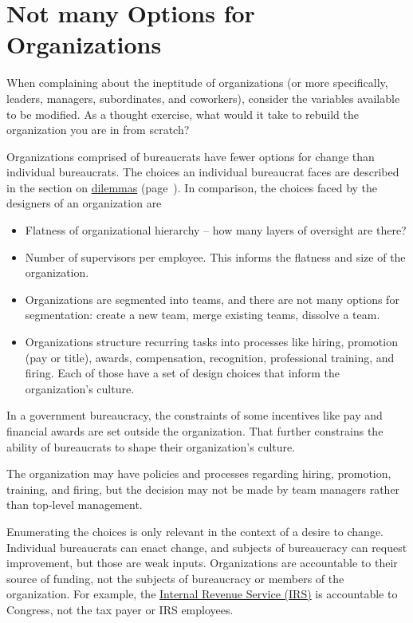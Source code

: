 \section{Not many Options for Organizations}

When complaining about the ineptitude of organizations (or more specifically, leaders, managers, subordinates, and coworkers), consider the variables available to be modified. As a thought exercise, what would it take to rebuild the organization you are in from scratch? 

Organizations comprised of bureaucrats have fewer options for change than individual bureaucrats. The choices an individual bureaucrat faces are described in the section on 
\hyperref[sec:dilemma-trilemma]{dilemmas}
(page~\pageref{sec:dilemma-trilemma}).
In comparison, the choices faced by the designers of an organization are
\begin{itemize}
    \item Flatness of organizational hierarchy -- how many layers of oversight are there?
    \item Number of supervisors per employee. This informs the flatness and size of the organization.
    \item Organizations are segmented into teams, and there are not many options for segmentation: create a new team, merge existing teams, dissolve a team.
    \item Organizations structure recurring tasks into processes like hiring, promotion (pay or title), awards, compensation, recognition, professional training, and firing. Each of those have a set of design choices that inform the organization's culture.
\end{itemize}
In a government bureaucracy, the constraints of some incentives like pay and financial awards are set outside the organization. That further constrains the ability of bureaucrats to shape their organization's culture.

The organization may have policies and processes regarding hiring, promotion, training, and firing, but the decision may not be made by team managers rather than top-level management. 

Enumerating the choices is only relevant in the context of a desire to change. 
Individual bureaucrats can enact change, and subjects of bureaucracy can request improvement, but those are weak inputs. 
Organizations are accountable to their source of funding, not the subjects of bureaucracy or members of the organization. For example, the \href{https://en.wikipedia.org/wiki/Internal_Revenue_Service}{Internal Revenue Service (IRS)} 
is accountable to Congress, not the tax payer or IRS employees. 


